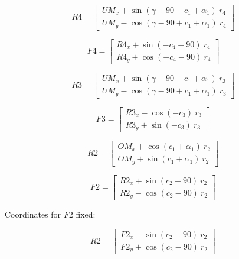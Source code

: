 \documentclass[10pt,a4paper]{article}
\begin{document}
\begin{multicols}{2}
\begin{equation}
R4 =  \begin{bmatrix} 
UM_x + \sin(\gamma - 90 + c_1 + \alpha_1)~r_4 \\
UM_y - \cos(\gamma - 90 + c_1 + \alpha_1)~r_4 \end{bmatrix}
\end{equation}

\begin{equation}
F4 =  \begin{bmatrix} 
R4_x + \sin(-c_4-90)~r_4 \\
R4_y + \cos(-c_4-90)~r_4 \end{bmatrix}
\end{equation}

\begin{equation}
R3 =  \begin{bmatrix} 
UM_x + \sin(\gamma - 90 + c_1 + \alpha_1)~r_3 \\
UM_y - \cos(\gamma - 90 + c_1 + \alpha_1)~r_3 \end{bmatrix}
\end{equation}

\begin{equation}
F3 =  \begin{bmatrix} 
R3_x - \cos(-c_3)~r_3 \\
R3_y + \sin(-c_3)~r_3 \end{bmatrix}
\end{equation}


\begin{equation}
R2 =  \begin{bmatrix} 
OM_x + \cos(c_1 + \alpha_1)~r_2 \\
OM_y + \sin(c_1 + \alpha_1)~r_2 \end{bmatrix}
\end{equation}

\begin{equation}
F2 =  \begin{bmatrix} 
R2_x + \sin(c_2 - 90)~r_2 \\
R2_y - \cos(c_2 - 90)~r_2 \end{bmatrix}
\label{eq:F1_end}
\end{equation}



Coordinates for $F2$ fixed:


\begin{equation}
R2 = \begin{bmatrix}
F2_x - \sin(c_2 - 90)~r_2 \\
F2_y + \cos(c_2 - 90)~r_2
\end{bmatrix}
\end{equation}


\end{multicols}
\end{document}
